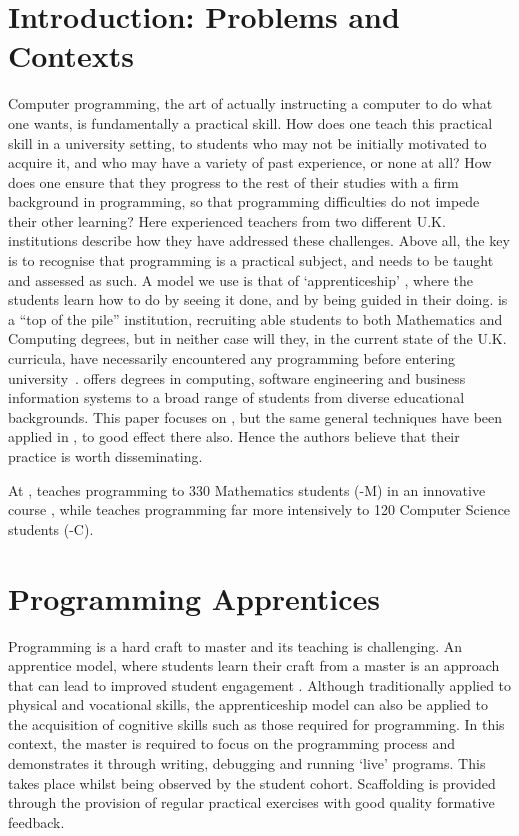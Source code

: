 \documentclass[conference,compsoc]{IEEEtran}
\begin{document}
\section{Introduction: Problems and Contexts}
Computer programming, the art of actually instructing a computer to do what one wants, is fundamentally a practical skill. How does one teach this practical skill in a university setting, to students who may not be initially motivated to acquire it, and who may have a variety of past experience, or none at all? How does one ensure that they progress to the rest of their studies with a firm background in programming, so that programming difficulties do not impede their other learning? Here experienced teachers from two different U.K. institutions describe how they have addressed these challenges. Above all, the key is to recognise that programming is a practical subject, and needs to be taught and assessed as such. A model we use is that of `apprenticeship' \cite{Viha}, where the students learn how to do by seeing it done, and by being guided in their doing. \Bath{} is a ``top of the pile'' institution, recruiting able students to both Mathematics and Computing degrees, but in neither case will they, in the current state of the U.K. curricula, have necessarily encountered any programming before entering university~\cite{brown-et-al-toce2014}. \Cardiff{} offers degrees in computing, software engineering and business information systems to a broad range of students from diverse educational backgrounds. This paper focuses on \Bath{}, but the same general techniques have been applied in \Cardiff{}, to good effect there also. Hence the authors believe that their practice is worth disseminating.

At \Bath, \JHD{} teaches programming to 330 Mathematics students (\Bath-M) in an innovative course \cite{XX}, while \RH{} teaches programming far more intensively to 120 Computer Science students (\Bath-C).

\section{Programming Apprentices}
Programming is a hard craft to master and its teaching is challenging. An apprentice model, where students learn their craft from a master is an approach that can lead to improved student engagement \cite{Astrachan,Viha}. Although traditionally applied to physical and vocational skills, the apprenticeship model can also be applied to the acquisition of cognitive skills such as those required for programming. In this context, the master is required to focus on the programming process and demonstrates it through writing, debugging and running `live' programs. This takes place whilst being observed by the student cohort. Scaffolding is provided through the provision of regular practical exercises with good quality formative feedback.
\end{document}
